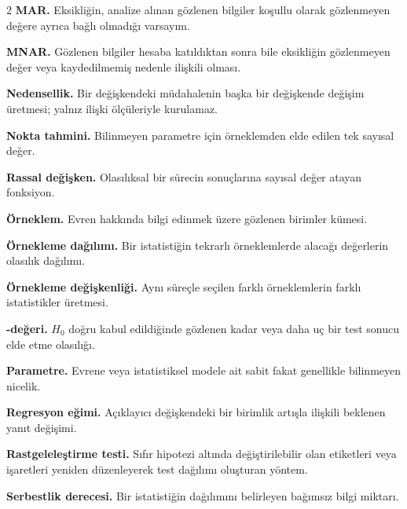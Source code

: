 \begin{multicols}{2}
\textbf{MAR.} Eksikliğin, analize alınan gözlenen bilgiler koşullu olarak
gözlenmeyen değere ayrıca bağlı olmadığı varsayım.\par\smallskip

\textbf{MNAR.} Gözlenen bilgiler hesaba katıldıktan sonra bile eksikliğin
gözlenmeyen değer veya kaydedilmemiş nedenle ilişkili olması.\par\smallskip

\textbf{Nedensellik.} Bir değişkendeki müdahalenin başka bir değişkende
değişim üretmesi; yalnız ilişki ölçüleriyle kurulamaz.\par\smallskip

\textbf{Nokta tahmini.} Bilinmeyen parametre için örneklemden elde edilen tek
sayısal değer.\par\smallskip

\textbf{Rassal değişken.} Olasılıksal bir sürecin sonuçlarına sayısal değer
atayan fonksiyon.\par\smallskip

\textbf{Örneklem.} Evren hakkında bilgi edinmek üzere gözlenen birimler
kümesi.\par\smallskip

\textbf{Örnekleme dağılımı.} Bir istatistiğin tekrarlı örneklemlerde alacağı
değerlerin olasılık dağılımı.\par\smallskip

\textbf{Örnekleme değişkenliği.} Aynı süreçle seçilen farklı örneklemlerin
farklı istatistikler üretmesi.\par\smallskip

\textbf{\pval-değeri.} $H_0$ doğru kabul edildiğinde gözlenen kadar veya daha uç
bir test sonucu elde etme olasılığı.\par\smallskip

\textbf{Parametre.} Evrene veya istatistiksel modele ait sabit fakat genellikle
bilinmeyen nicelik.\par\smallskip

\textbf{Regresyon eğimi.} Açıklayıcı değişkendeki bir birimlik artışla
ilişkili beklenen yanıt değişimi.\par\smallskip

\ifimoders\else
\textbf{Rastgeleleştirme testi.} Sıfır hipotezi altında değiştirilebilir olan
etiketleri veya işaretleri yeniden düzenleyerek test dağılımı oluşturan yöntem.\par\smallskip
\fi

\textbf{Serbestlik derecesi.} Bir istatistiğin dağılımını belirleyen bağımsız
bilgi miktarı.\par\smallskip


\end{multicols}

